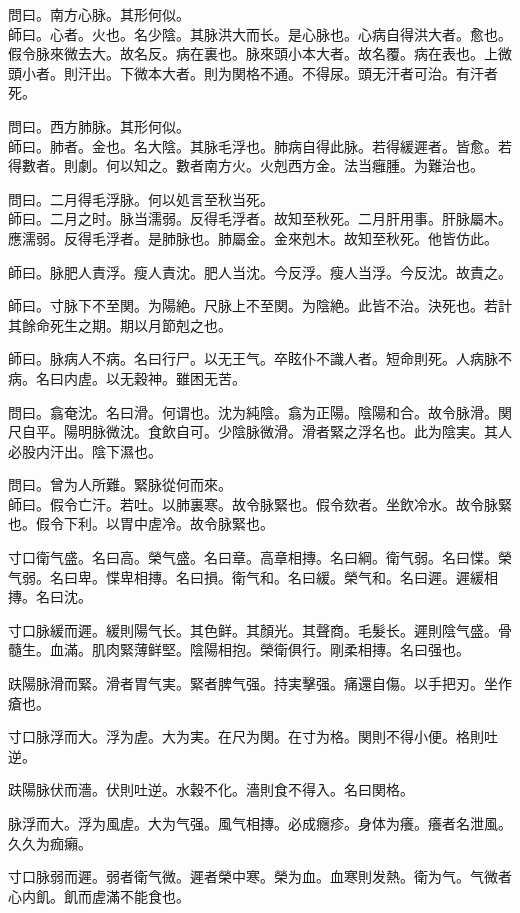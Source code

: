\documentclass[12pt,twoside,UTF8,b5paper]{ctexbook}
\begin{document}
問曰。南方心脉。其形何似。\\
師曰。心者。火也。名少陰。其脉洪大而长。是心脉也。心病自得洪大者。愈也。假令脉來微去大。故名反。病在裏也。脉來頭小本大者。故名覆。病在表也。上微頭小者。則汗出。下微本大者。則为関格不通。不得尿。頭无汗者可治。有汗者死。

問曰。西方肺脉。其形何似。\\
師曰。肺者。金也。名大陰。其脉毛浮也。肺病自得此脉。若得緩遲者。皆愈。若得數者。則劇。何以知之。數者南方火。火剋西方金。法当癰腫。为難治也。

問曰。二月得毛浮脉。何以処言至秋当死。\\
師曰。二月之时。脉当濡弱。反得毛浮者。故知至秋死。二月肝用事。肝脉屬木。應濡弱。反得毛浮者。是肺脉也。肺屬金。金來剋木。故知至秋死。他皆仿此。

師曰。脉肥人責浮。瘦人責沈。肥人当沈。今反浮。瘦人当浮。今反沈。故責之。

師曰。寸脉下不至関。为陽絶。尺脉上不至関。为陰絶。此皆不治。決死也。若計其餘命死生之期。期以月節剋之也。

師曰。脉病人不病。名曰行尸。以无王气。卒眩仆不識人者。短命則死。人病脉不病。名曰内虗。以无穀神。雖困无苦。

問曰。翕奄沈。名曰滑。何谓也。沈为純陰。翕为正陽。陰陽和合。故令脉滑。関尺自平。陽明脉微沈。食飲自可。少陰脉微滑。滑者緊之浮名也。此为陰実。其人必股内汗出。陰下濕也。

問曰。曾为人所難。緊脉從何而來。\\
師曰。假令亡汗。若吐。以肺裏寒。故令脉緊也。假令欬者。坐飲冷水。故令脉緊也。假令下利。以胃中虗冷。故令脉緊也。

寸口衛气盛。名曰高。榮气盛。名曰章。高章相摶。名曰綱。衛气弱。名曰惵。榮气弱。名曰卑。惵卑相摶。名曰損。衛气和。名曰緩。榮气和。名曰遲。遲緩相摶。名曰沈。

寸口脉緩而遲。緩則陽气长。其色鲜。其顏光。其聲商。毛髮长。遲則陰气盛。骨髓生。血滿。肌肉緊薄鲜堅。陰陽相抱。榮衛俱行。剛柔相摶。名曰强也。

趺陽脉滑而緊。滑者胃气実。緊者脾气强。持実擊强。痛還自傷。以手把刃。坐作瘡也。

寸口脉浮而大。浮为虗。大为実。在尺为関。在寸为格。関則不得小便。格則吐逆。

趺陽脉伏而濇。伏則吐逆。水穀不化。濇則食不得入。名曰関格。

脉浮而大。浮为風虗。大为气强。風气相摶。必成癮疹。身体为癢。癢者名泄風。久久为痂癩。

寸口脉弱而遲。弱者衛气微。遲者榮中寒。榮为血。血寒則发熱。衛为气。气微者心内飢。飢而虗滿不能食也。
\end{document}
